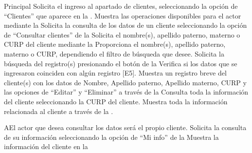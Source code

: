 	\begin{UCtrayectoria}{Principal}
		\UCpaso[\UCactor] Solicita el ingreso al apartado de clientes, seleccionando la opción de ``Clientes'' que aparece en la  .
		\UCpaso Muestra las operaciones disponibles para el actor mediante la 
		\UCpaso[\UCactor] Solicita la consulta de los datos de un cliente seleccionando la opción de ``Consultar clientes'' de la 
		\UCpaso Solicita el nombre(s), apellido paterno, materno o CURP del cliente mediante la 
		\UCpaso[\UCactor] Proporciona el nombre(s), apellido paterno, materno o CURP, dependiendo el filtro de búsqueda que desee.
		\UCpaso[\UCactor] Solicita la búsqueda del registro(s) presionando el botón  de la 
		\UCpaso Verifica si los datos que se ingresaron coinciden con algún registro [E5].
		\UCpaso Muestra un registro breve del cliente(s) con los datos de Nombre, Apellido paterno, Apellido materno, CURP y las opciones de ``Editar'' y ``Eliminar'' a través de la 
		\UCpaso[\UCactor] Consulta toda la información del cliente seleccionando la CURP del cliente.
		\UCpaso Muestra toda la información relacionada al cliente a través de la . 
	\end{UCtrayectoria}
	
	\begin{UCtrayectoriaA}{A}{El actor que desea consultar los datos será el propio cliente.}
			\UCpaso[\UCactor] Solicita la consulta de su información seleccionando la opción de ``Mi info'' de la 
			\UCpaso Muestra la información del cliente en la 
		\end{UCtrayectoriaA}
	

		

	